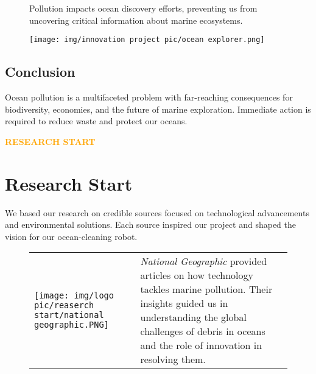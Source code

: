 \begin{figure}[h!]
    \begin{minipage}{0.6\textwidth}
        Pollution impacts ocean discovery efforts, preventing us from uncovering critical information about marine ecosystems.
    \end{minipage}
    \hfill
    \begin{minipage}{0.35\textwidth}
        \texttt{[image: img/innovation project pic/ocean explorer.png]} %
    \end{minipage}
\end{figure}


\subsection{Conclusion}
Ocean pollution is a multifaceted problem with far-reaching consequences for biodiversity, economies, and the future of marine exploration. Immediate action is required to reduce waste and protect our oceans.

\newpage

\begin{center}
    \huge \textbf{\textcolor{orange}{RESEARCH START}} \\[0.5cm]
\end{center}
\section{Research Start}

We based our research on credible sources focused on technological advancements and environmental solutions. Each source inspired our project and shaped the vision for our ocean-cleaning robot.


\begin{figure}[H]
    \centering
    \begin{tabular}{m{} m{}}
        \texttt{[image: img/logo pic/reaserch start/national geographic.PNG]} & 
        \textit{\color{navy}National Geographic} provided articles on how technology tackles marine pollution. Their insights guided us in understanding the global challenges of debris in oceans and the role of innovation in resolving them.
    \end{tabular}
\end{figure}

\vspace{1cm} %


